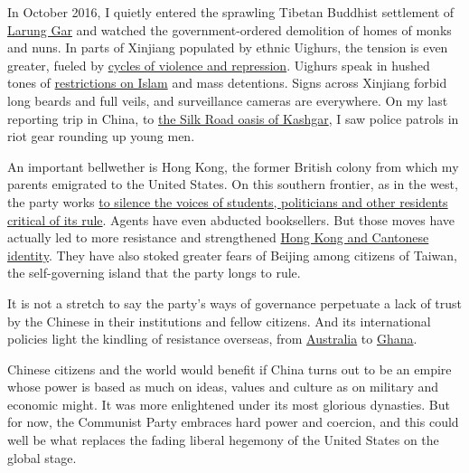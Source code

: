 In October 2016, I quietly entered the sprawling Tibetan Buddhist
settlement of
\href{https://www.nytimes3xbfgragh.onion/2016/11/28/world/asia/china-takes-a-chain-saw-to-a-center-of-tibetan-buddhism.html}{Larung
Gar} and watched the government-ordered demolition of homes of monks and
nuns. In parts of Xinjiang populated by ethnic Uighurs, the tension is
even greater, fueled by
\href{http://www.nytimes3xbfgragh.onion/2009/07/12/weekinreview/12wong.html}{cycles
of violence and repression}. Uighurs speak in hushed tones of
\href{http://www.nytimes3xbfgragh.onion/2008/10/19/world/asia/19xinjiang.html}{restrictions
on Islam} and mass detentions. Signs across Xinjiang forbid long beards
and full veils, and surveillance cameras are everywhere. On my last
reporting trip in China, to
\href{https://www.nytimes3xbfgragh.onion/2017/07/19/world/asia/dodging-chinese-police-in-kashgar-a-silk-road-oasis-town.html}{the
Silk Road oasis of Kashgar}, I saw police patrols in riot gear rounding
up young men.

An important bellwether is Hong Kong, the former British colony from
which my parents emigrated to the United States. On this southern
frontier, as in the west, the party works
\href{https://www.nytimes3xbfgragh.onion/2017/08/17/world/asia/hong-kong-joshua-wong-jailed-umbrella-movement.html}{to
silence the voices of students, politicians and other residents critical
of its rule}. Agents have even abducted booksellers. But those moves
have actually led to more resistance and strengthened
\href{https://www.nytimes3xbfgragh.onion/2014/10/08/world/asia/hong-kong-people-looking-in-mirror-see-fading-chinese-identity.html}{Hong
Kong and Cantonese identity}. They have also stoked greater fears of
Beijing among citizens of Taiwan, the self-governing island that the
party longs to rule.

It is not a stretch to say the party's ways of governance perpetuate a
lack of trust by the Chinese in their institutions and fellow citizens.
And its international policies light the kindling of resistance
overseas, from
\href{https://www.nytimes3xbfgragh.onion/2017/12/19/world/australia/australia-china-backlash-influence.html}{Australia}
to
\href{http://www.nytimes3xbfgragh.onion/2013/06/07/world/africa/ghana-arrests-chinese-in-gold-mining-regions.html}{Ghana}.

Chinese citizens and the world would benefit if China turns out to be an
empire whose power is based as much on ideas, values and culture as on
military and economic might. It was more enlightened under its most
glorious dynasties. But for now, the Communist Party embraces hard power
and coercion, and this could well be what replaces the fading liberal
hegemony of the United States on the global stage.

